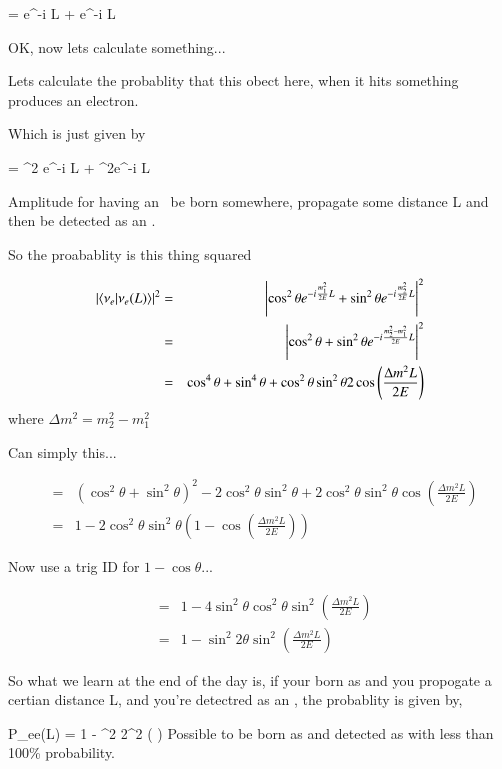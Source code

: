 {\be
{} = \cos\theta e^{-i  L} \ket{\nuone} + \sin\theta e^{-i  L} \ket{\nutwo}
\ee

OK, now lets calculate something...


Lets calculate the probablity that this obect here, when it hits something produces an electron. 

Which is just given by 

\be
{} = \cos^2 \theta e^{-i  L} + \sin^2\theta e^{-i  L} 
\ee

Amplitude for having an \nue\ be born somewhere, propagate some distance L and then be detected as an \nue.

So the proabablity is this thing squared

\begin{eqnarray*}
\left|\braket{\nu_e | \nu_e(L) }\right|^2 &=& \left|\cos^2 \theta e^{-i \frac{m_1^2}{2E} L} + \sin^2\theta e^{-i \frac{m_2^2}{2E} L} \right|^2\\
       &=& \left|\cos^2 \theta+ \sin^2\theta e^{-i \frac{m_2^2 - m_1^2}{2E} L} \right|^2\\
       &=& \cos^4 \theta+ \sin^4\theta  + \cos^2\theta \sin^2 \theta 2 \cos \left( \frac{\Delta m^2 L}{2E} \right)
\end{eqnarray*}
where $\Delta m^2 = m_2^2 - m_1^2$


Can simply this...

\begin{eqnarray*}
 &=& \left( \cos^2 \theta + \sin^2 \theta \right)^2  - 2 \cos^2 \theta \sin^2 \theta  + 2 \cos^2 \theta \sin^2 \theta \cos \left( \frac{\Delta m^2 L}{2E} \right) \\
 &=& 1 - 2 \cos^2 \theta \sin^2 \theta \left( 1  - \cos \left( \frac{\Delta m^2 L}{2E} \right) \right)
\end{eqnarray*}


Now use a trig ID for $1-\cos\theta$...

\begin{eqnarray*}
 &=& 1 - 4 \sin^2 \theta \cos^2 \theta \sin^2 \left( \frac{\Delta m^2 L}{2E} \right)\\
 &=& 1 -  \sin^2 2\theta \sin^2 \left( \frac{\Delta m^2 L}{2E} \right)
\end{eqnarray*}

So what we learn at the end of the day is, if your born as \nue and you propogate a certian distance L, and you're detectred as an \nue, the probablity is given by,

\be 
P_ee(L) = 1 - \sin^2 2\theta \sin^2 \left(  \right)
\ee 
Possible to be born as \nue and detected as \nue with less than 100\% probability.

}



